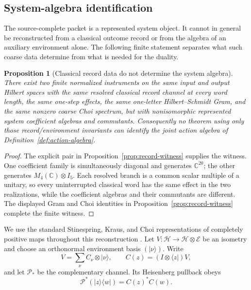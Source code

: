 \documentclass[11pt]{article}
\numberwithin{equation}{section}
\newtheorem{proposition}[theorem]{Proposition}
\theoremstyle{definition}
\theoremstyle{remark}
\newcommand{\C}{\mathbb C}
\newcommand{\Hh}{\mathcal H}
\begin{document}
\subsection{System-algebra identification}
\label{sec:source-identifiability}

The source-complete packet is a represented system object.  It cannot in
general be reconstructed from a classical outcome record or from the algebra
of an auxiliary environment alone.  The following finite statement separates
what such coarse data determine from what is needed for the duality.

\begin{proposition}[Classical record data do not determine the system algebra]
\label{thm:record-nonidentifiability}
There exist two finite normalized instruments on the same input and output
Hilbert spaces with the same resolved classical record channel at every word
length, the same one-step effects, the same one-letter Hilbert--Schmidt Gram,
and the same nonzero coarse Choi spectrum, but with nonisomorphic represented
system coefficient algebras and commutants.  Consequently no theorem using
only those record/environment invariants can identify the joint action algebra
of Definition~\ref{def:action-algebra}.
\end{proposition}

\begin{proof}
The explicit pair in Proposition~\ref{prop:record-witness} supplies the witness.
One coefficient family is simultaneously diagonal and generates
$\C^{20}$; the other generates $M_4(\C)\otimes I_5$.  Each resolved branch is
a common scalar multiple of a unitary, so every uninterrupted classical word
has the same effect in the two realizations, while the coefficient algebras
and their commutants are different.  The displayed Gram and Choi identities in
Proposition~\ref{prop:record-witness} complete the finite witness.
\end{proof}

We use the standard Stinespring, Kraus, and Choi representations of completely
positive maps throughout this reconstruction \cite{Stinespring1955,Kraus1983,Choi1975}.
Let $V:\Hh\to\Hh\otimes\mathcal E$ be an isometry and choose an orthonormal
environment basis $(|\nu\rangle)$.  Write
\[
 V=\sum_\nu C_\nu\otimes|\nu\rangle,
 \qquad
 C(z)=(I\otimes\langle z|)V,
\]
and let $\mathcal P_*$ be the complementary channel.  Its Heisenberg pullback
obeys
\begin{equation}
 \mathcal P^*(|z\rangle\langle w|)=C(z)^*C(w).
 \label{eq:complementary-pullback}
\end{equation}
\end{document}

